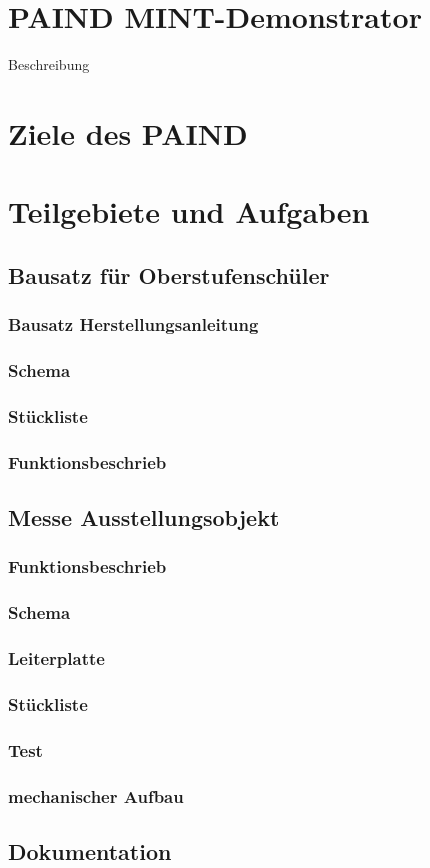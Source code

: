 \section{PAIND MINT-Demonstrator}
Beschreibung
\section{Ziele des PAIND}
\section{Teilgebiete und Aufgaben}

\subsection{Bausatz für Oberstufenschüler}
\subsubsection{Bausatz Herstellungsanleitung}
\subsubsection{Schema}
\subsubsection{Stückliste}
\subsubsection{Funktionsbeschrieb}

\subsection{Messe Ausstellungsobjekt}
\subsubsection{Funktionsbeschrieb}
\subsubsection{Schema}
\subsubsection{Leiterplatte}
\subsubsection{Stückliste}
\subsubsection{Test}
\subsubsection{mechanischer Aufbau}

\subsection{Dokumentation}
